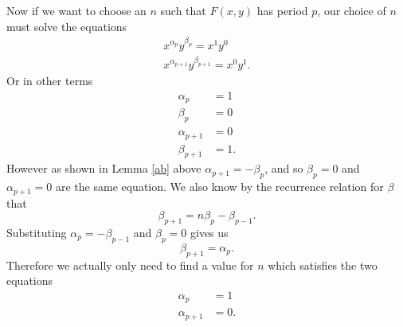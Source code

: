 \documentclass[12pt]{article}
\begin{document}
Now if we want to choose an $n$ such that  $F(x,y)$ has period $p$, our choice of $n$ must solve the equations 
\begin{align*}
x^{\alpha_p} y^{\beta_p} = x^{1}y^{0} \\
x^{\alpha_{p+1}} y^{\beta_{p+1}} = x^{0}y^{1}.
\end{align*}
Or in other terms
\begin{align*}
\alpha_p &=1 \\
\beta_p &=0\\ 
\alpha_{p+1} &= 0 \\
\beta_{p+1} &= 1.
\end{align*}
However as shown in Lemma \ref{ab} above $\alpha_{p+1} = -\beta_p$, and so $\beta_p=0$ and $\alpha_{p+1} =0$ are the same equation.  We also know by the recurrence relation for $\beta$ that 
\begin{equation*}
\beta_{p+1} = n \beta_{p} - \beta_{p-1}.
\end{equation*}
Substituting $\alpha_p = -\beta_{p-1}$ and $\beta_{p}=0$ gives us 
\begin{equation*}
\beta_{p+1} = \alpha_p.
\end{equation*} 
Therefore we actually only need to find a value for $n$ which satisfies the two equations
\begin{align*}
\alpha_p &=1\\
\alpha_{p+1}&=0.
\end{align*}
\end{document}

